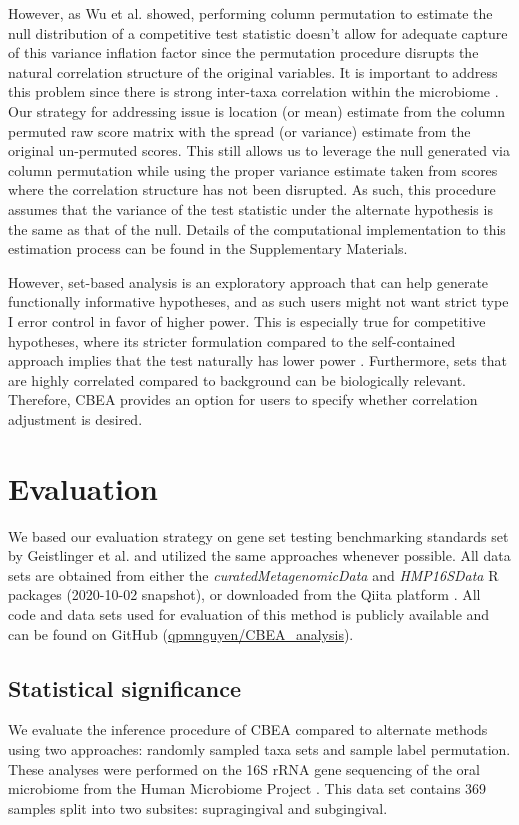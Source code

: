 \documentclass[10pt,letterpaper]{article}
\begin{document}
However, as Wu et al. \cite{wu2012} showed, performing column permutation to estimate the null distribution of a competitive test statistic doesn't allow for adequate capture of this variance inflation factor since the permutation procedure disrupts the natural correlation structure of the original variables. It is important to address this problem since there is strong inter-taxa correlation within the microbiome \cite{kurtz2015a}. Our strategy for addressing issue is location (or mean) estimate from the column permuted raw score matrix with the spread (or variance) estimate from the original un-permuted scores. This still allows us to leverage the null generated via column permutation while using the proper variance estimate taken from scores where the correlation structure has not been disrupted. As such, this procedure assumes that the variance of the test statistic under the alternate hypothesis is the same as that of the null. Details of the computational implementation to this estimation process can be found in the Supplementary Materials.   

However, set-based analysis is an exploratory approach that can help generate functionally informative hypotheses, and as such users might not want strict type I error control in favor of higher power. This is especially true for competitive hypotheses, where its stricter formulation compared to the self-contained approach implies that the test naturally has lower power \cite{goeman2007, ackerman2009}. Furthermore, sets that are highly correlated compared to background can be biologically relevant. Therefore, CBEA provides an option for users to specify whether correlation adjustment is desired. 

\section*{Evaluation}
We based our evaluation strategy on gene set testing benchmarking standards set by Geistlinger et al. \cite{geistlinger2021} and utilized the same approaches whenever possible. All data sets are obtained from either the \emph{curatedMetagenomicData} \cite{pasolli2017} and \emph{HMP16SData} \cite{schiffer2019} R packages (2020-10-02 snapshot), or downloaded from the Qiita platform \cite{gonzalez2018}. All code and data sets used for evaluation of this method is publicly available and can be found on GitHub (\href{www.github.com/qpmnguyen/CBEA\_analysis}{qpmnguyen/CBEA\_analysis}). 

\subsection*{Statistical significance}
We evaluate the inference procedure of CBEA compared to alternate methods using two approaches: randomly sampled taxa sets and sample label permutation. These analyses were performed on the 16S rRNA gene sequencing of the oral microbiome from the Human Microbiome Project \cite{consortium2012, proctor2019}. This data set contains 369 samples split into two subsites: supragingival and subgingival. 
\end{document}
